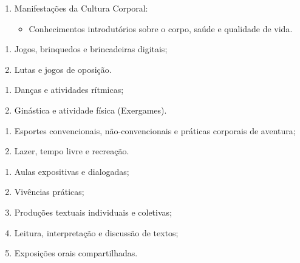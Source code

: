 \begin{pud}
	\programa
	\begin{description}[itemsep=0em]
		\item[UNIDADE I:]\qquad 
	         \begin{enumerate}[itemsep=0em, topsep=0em]
				\item Manifestações da Cultura Corporal:
				\begin{itemize}
					\item Conhecimentos introdutórios sobre o corpo, saúde e qualidade de vida.
				\end{itemize}
	        \end{enumerate}
	        
	    \item[UNIDADE II:] \qquad
	         \begin{enumerate}[itemsep=0em, topsep=0em]
				\item Jogos, brinquedos e brincadeiras digitais;
				\item Lutas e jogos de oposição.
	        \end{enumerate}
	
		\item[UNIDADE III:] \qquad
	         \begin{enumerate}[itemsep=0em, topsep=0em]
				\item   Danças e atividades rítmicas;
				\item Ginástica e atividade física (Exergames).
	        \end{enumerate}
	                
	    \item[UNIDADE IV:] \qquad
	         \begin{enumerate}[itemsep=0em, topsep=0em]
				\item Esportes convencionais, não-convencionais e práticas corporais de aventura;
				\item Lazer, tempo livre e recreação.
	        \end{enumerate}
                                        

	\end{description}
	
	\metodologia
	\begin{enumerate}[itemsep=0em, topsep=0em]
		\vspace{-1em}
		\item  Aulas expositivas e dialogadas;
		\item Vivências práticas; 
		\item Produções textuais individuais e coletivas; 
		\item Leitura, interpretação e discussão de textos; 
		\item Exposições orais compartilhadas.
	\end{enumerate}
	

\end{pud}
